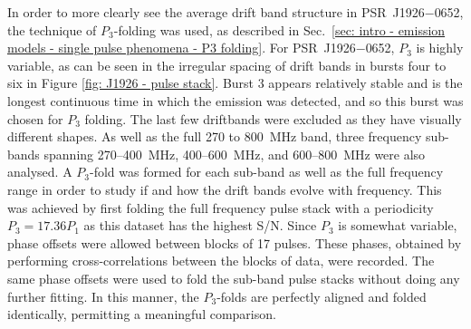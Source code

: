 In order to more clearly see the average drift band structure in PSR~J1926$-$0652, the technique of $P_3$-folding was used, as described in Sec.~\ref{sec: intro - emission models - single pulse phenomena - P3 folding}. For PSR~J1926$-$0652, $P_3$ is highly variable, as can be seen in the irregular spacing of drift bands in bursts four to six in Figure \ref{fig: J1926 - pulse stack}. Burst 3 appears relatively stable and is the longest continuous time in which the emission was detected, and so this burst was chosen for $P_3$ folding. The last few driftbands were excluded as they have visually different shapes. As well as the full 270 to 800~MHz band, three frequency sub-bands spanning 270--400~MHz, 400--600~MHz, and 600--800~MHz were also analysed. A $P_3$-fold was formed for each sub-band as well as the full frequency range in order to study if and how the drift bands evolve with frequency. This was achieved by first folding the full frequency pulse stack with a periodicity $P_3 = 17.36P_1$ as this dataset has the highest S/N. Since $P_3$ is somewhat variable, phase offsets were allowed between blocks of 17 pulses. These phases, obtained by performing cross-correlations between the blocks of data, were recorded. The same phase offsets were used to fold the sub-band pulse stacks without doing any further fitting. In this manner, the $P_3$-folds are perfectly aligned and folded identically, permitting a meaningful comparison.

